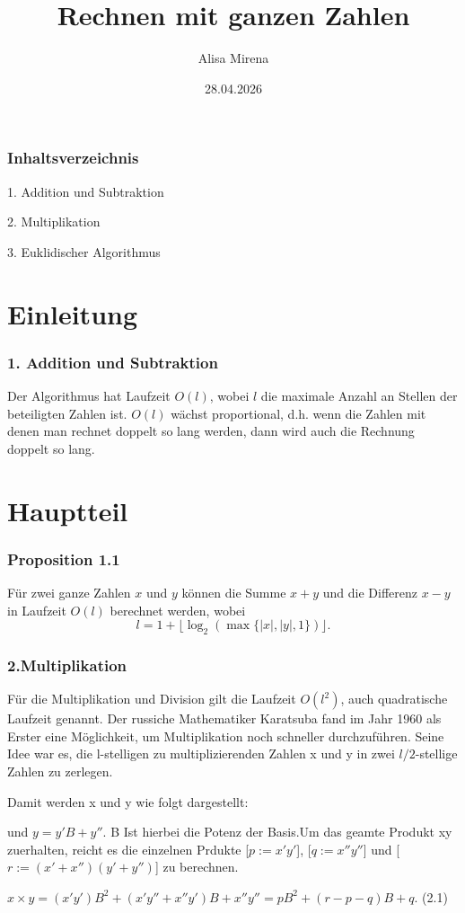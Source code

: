 \documentclass[10pt]{beamer}
\title{Rechnen mit ganzen Zahlen}
\author{Alisa Mirena}
\date{28.04.2026}
\begin{document}
\frame{\titlepage}

\begin{frame}
\frametitle{Inhaltsverzeichnis}

1. Addition und Subtraktion

2. Multiplikation

3. Euklidischer Algorithmus

\end{frame}

\section{Einleitung}

\begin{frame}
\frametitle{1. Addition und Subtraktion}
Der Algorithmus hat Laufzeit $O(l)$, wobei $l$ die maximale Anzahl an Stellen der beteiligten Zahlen ist. $O(l)$ wächst proportional, d.h. wenn die Zahlen mit denen man rechnet doppelt so lang werden, dann wird auch die Rechnung doppelt so lang.
\end{frame}

\section{Hauptteil}

\begin{frame}
\frametitle{Proposition 1.1 }

Für zwei ganze Zahlen $x$ und $y$ können die Summe $x+y$ und die Differenz $x-y$ in Laufzeit $O(l)$ berechnet werden, wobei
\[
l = 1 + \lfloor \log_2(\max\{|x|, |y|, 1\}) \rfloor.
\]


\end{frame}


\begin{frame}
\frametitle{2.Multiplikation}
    Für die Multiplikation und Division gilt die Laufzeit $O(l^2)$, auch quadratische Laufzeit genannt. 
Der russiche Mathematiker Karatsuba fand im Jahr 1960 als Erster eine Möglichkeit, um Multiplikation noch schneller durchzuführen. Seine Idee war es, die l-stelligen zu multiplizierenden Zahlen x und y in zwei $l/2$-stellige Zahlen zu zerlegen. 
\end{frame}

\begin{frame}
    Damit werden x und y wie folgt dargestellt:

    
    und    $y=y'B+y''$.
B Ist hierbei die Potenz der Basis.Um das geamte Produkt xy zuerhalten, reicht es die einzelnen Prdukte [$p:= x'y'$], [$q:= x''y''$] und [$r:= (x'+x'') (y'+y'')$] zu berechnen.
\vspace{0.2cm}

 \equation $x\times y = (x'y')B^2+(x'y''+x''y')B+x''y''=pB^2+(r-p-q)B+q$. (2.1)
\end{frame}
\end{document}
